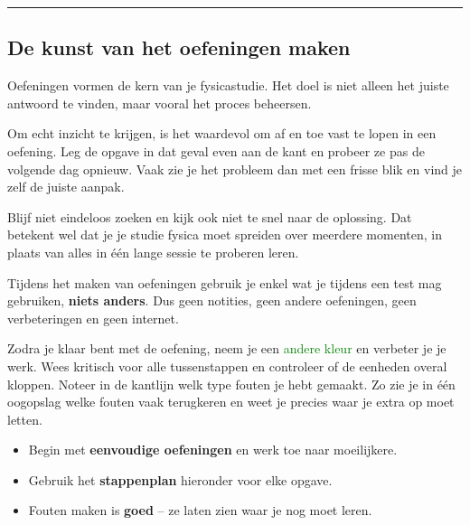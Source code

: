 {\begin{center}
\rule{0.6\textwidth}{0.4pt}
\end{center}

\subsection*{De kunst van het oefeningen maken}

Oefeningen vormen de kern van je fysicastudie.
Het doel is niet alleen het juiste antwoord te vinden, maar vooral het proces beheersen.

Om echt inzicht te krijgen, is het waardevol om af en toe vast te lopen in een oefening.
Leg de opgave in dat geval even aan de kant en probeer ze pas de volgende dag opnieuw.
Vaak zie je het probleem dan met een frisse blik en vind je zelf de juiste aanpak.

Blijf niet eindeloos zoeken en kijk ook niet te snel naar de oplossing.
Dat betekent wel dat je je studie fysica moet spreiden over meerdere momenten,
in plaats van alles in één lange sessie te proberen leren.

Tijdens het maken van oefeningen gebruik je enkel wat je tijdens een test mag gebruiken, \textbf{niets anders}.
Dus geen notities, geen andere oefeningen, geen verbeteringen en geen internet.

Zodra je klaar bent met de oefening, neem je een \textcolor{green}{andere kleur} en verbeter je je werk.
Wees kritisch voor alle tussenstappen en controleer of de eenheden overal kloppen.
Noteer in de kantlijn welk type fouten je hebt gemaakt.
Zo zie je in één oogopslag welke fouten vaak terugkeren en weet je precies waar je extra op moet letten.

\begin{itemize}
    \item Begin met \textbf{eenvoudige oefeningen} en werk toe naar moeilijkere.
    \item Gebruik het \textbf{stappenplan} hieronder voor elke opgave.
    \item Fouten maken is \textbf{goed} – ze laten zien waar je nog moet leren.
\end{itemize}

}
